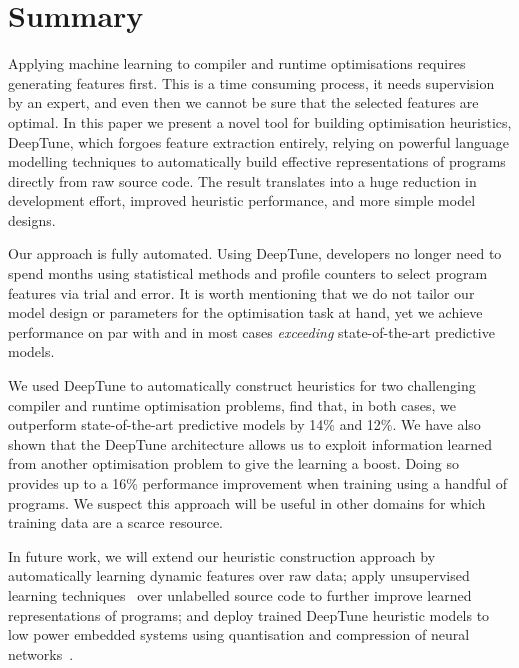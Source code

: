 \section{Summary}%
\label{sec:conclusion}

Applying machine learning to compiler and runtime optimisations requires generating features first. This is a time consuming process, it needs supervision by an expert, and even then we cannot be sure that the selected features are optimal. In this paper we present a novel tool for building optimisation heuristics, DeepTune, which forgoes feature extraction entirely, relying on powerful language modelling techniques to automatically build effective representations of programs directly from raw source code. The result translates into a huge reduction in development effort, improved heuristic performance, and more simple model designs.

Our approach is fully automated. Using DeepTune, developers no longer need to spend months using statistical methods and profile counters to select program features via trial and error. It is worth mentioning that we do not tailor our model design or parameters for the optimisation task at hand, yet we achieve performance on par with and in most cases \emph{exceeding} state-of-the-art predictive models.

We used DeepTune to automatically construct heuristics for two challenging compiler and runtime optimisation problems, find that, in both cases, we outperform state-of-the-art predictive models by 14\% and 12\%. We have also shown that the DeepTune architecture allows us to exploit information learned from another optimisation problem to give the learning a boost. Doing so provides up to a 16\% performance improvement when training using a handful of programs. We suspect this approach will be useful in other domains for which training data are a scarce resource.

In future work, we will extend our heuristic construction approach by automatically learning dynamic features over raw data; apply unsupervised learning techniques~\cite{Le2012} over unlabelled source code to further improve learned representations of programs; and deploy trained DeepTune heuristic models to low power embedded systems using quantisation and compression of neural networks~\cite{Han2015}.
